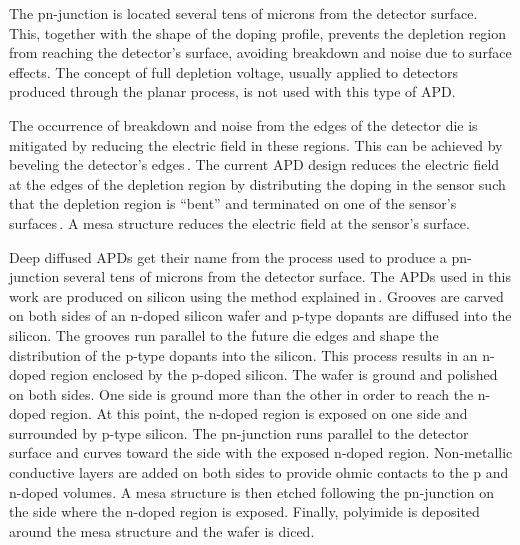 \documentclass{article}
\begin{document}
The pn-junction is located several tens of microns from the detector surface.
This, together with the shape of the doping profile, prevents the depletion region from reaching the detector's surface, avoiding breakdown and noise due to surface effects.
The concept of full depletion voltage, usually applied to detectors produced through the planar process, is not used with this type of APD.

The occurrence of breakdown and noise from the edges of the detector die is mitigated by reducing the electric field in these regions.
This can be achieved by beveling the detector's edges\,\cite{mcclish2004}.
The current APD design reduces the electric field at the edges of the depletion region by distributing the doping in the sensor such that the depletion region is ``bent'' and terminated on one of the sensor's surfaces\,\cite{mcclish2004}.
A mesa structure reduces the electric field at the sensor's surface.

Deep diffused APDs get their name from the process used to produce a pn-junction several tens of microns from the detector surface.
The APDs used in this work are produced on silicon using the method explained in\,\cite{mcclish2004,apdPatent}.
Grooves are carved on both sides of an n-doped silicon wafer and p-type dopants are diffused into the silicon.
The grooves run parallel to the future die edges and shape the distribution of the p-type dopants into the silicon.
This process results in an n-doped region enclosed by the p-doped silicon.
The wafer is ground and polished on both sides.
One side is ground more than the other in order to reach the n-doped region.
At this point, the n-doped region is exposed on one side and surrounded by p-type silicon.
The pn-junction runs parallel to the detector surface and curves toward the side with the exposed n-doped region.
Non-metallic conductive layers are added on both sides to provide ohmic contacts to the p and n-doped volumes.
A mesa structure is then etched following the pn-junction on the side where the n-doped region is exposed.
Finally, polyimide is deposited around the mesa structure and the wafer is diced.
\end{document}
